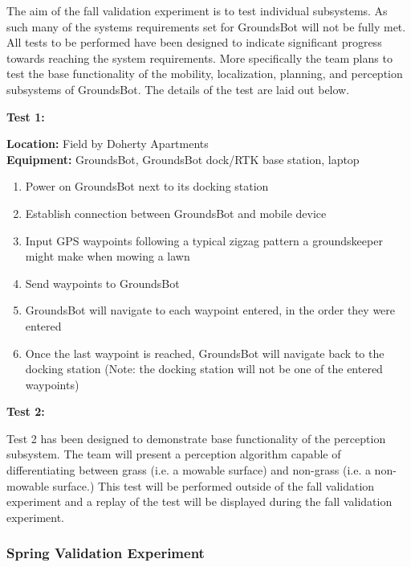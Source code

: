 \documentclass[12pt]{extarticle}
\begin{document}
	The aim of the fall validation experiment is to test individual subsystems. As such many of the systems requirements set for GroundsBot will not be fully met. All tests to be performed have been designed to indicate significant progress towards reaching the system requirements. More specifically the team plans to test the base functionality of the mobility, localization, planning, and perception subsystems of GroundsBot. The details of the test are laid out below.
\\
\begin{center}
\textbf{Test 1:}
\end{center}
 \textbf{Location:} Field by Doherty Apartments
\\
\textbf{Equipment:} GroundsBot, GroundsBot dock/RTK base station, laptop
\begin{enumerate}
  \item Power on GroundsBot next to its docking station
  \item Establish connection between GroundsBot and mobile device
  \item Input GPS waypoints following a typical zigzag pattern a groundskeeper might make when mowing a lawn
  \item Send waypoints to GroundsBot
  \item GroundsBot will navigate to each waypoint entered, in the order they were entered
  \item Once the last waypoint is reached, GroundsBot will navigate back to the docking station (Note: the docking station will not be one of the entered waypoints)
\end{enumerate}

\begin{center}
\textbf{Test 2:}
\end{center}
Test 2 has been designed to demonstrate base functionality of the perception subsystem. The team will present a perception algorithm capable of differentiating between grass (i.e. a mowable surface) and non-grass (i.e. a non-mowable surface.) This test will be performed outside of the fall validation experiment and a replay of the test will be displayed during the fall validation experiment.

\subsubsection{Spring Validation Experiment}
\end{document}
